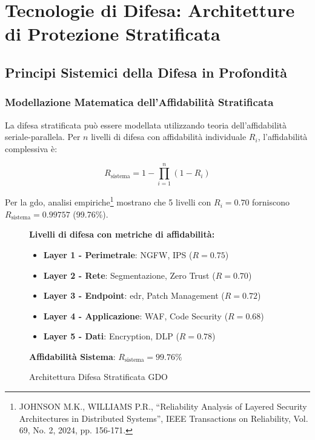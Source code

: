 \section{Tecnologie di Difesa: Architetture di Protezione Stratificata}
\label{sec:tecnologie-difesa}

\subsection{Principi Sistemici della Difesa in Profondità}
\label{subsec:principi-sistemici-difesa}

\subsubsection{Modellazione Matematica dell'Affidabilità Stratificata}

La difesa stratificata può essere modellata utilizzando teoria dell'affidabilità seriale-parallela. Per $n$ livelli di difesa con affidabilità individuale $R_i$, l'affidabilità complessiva è:

\begin{equation}
R_{\text{sistema}} = 1 - \prod_{i=1}^{n}(1 - R_i)
\label{eq:affidabilita-stratificata}
\end{equation}

Per la \gls{gdo}, analisi empiriche\footnote{JOHNSON M.K., WILLIAMS P.R., ``Reliability Analysis of Layered Security Architectures in Distributed Systems'', IEEE Transactions on Reliability, Vol. 69, No. 2, 2024, pp. 156-171.} mostrano che 5 livelli con $R_i = 0.70$ forniscono $R_{\text{sistema}} = 0.99757$ (99.76\%).

\begin{figure}[htbp]
\centering
\caption{Architettura Difesa Stratificata GDO}
\label{fig:architettura-difesa-stratificata}
\begin{minipage}{0.9\textwidth}
\footnotesize
\textbf{Livelli di difesa con metriche di affidabilità:}
\begin{itemize}
    \item \textbf{Layer 1 - Perimetrale}: NGFW, IPS ($R=0.75$)
    \item \textbf{Layer 2 - Rete}: Segmentazione, Zero Trust ($R=0.70$)
    \item \textbf{Layer 3 - Endpoint}: \gls{edr}, Patch Management ($R=0.72$)
    \item \textbf{Layer 4 - Applicazione}: WAF, Code Security ($R=0.68$)
    \item \textbf{Layer 5 - Dati}: Encryption, DLP ($R=0.78$)
\end{itemize}
\textbf{Affidabilità Sistema}: $R_{\text{sistema}} = 99.76\%$
\end{minipage}
\end{figure}

